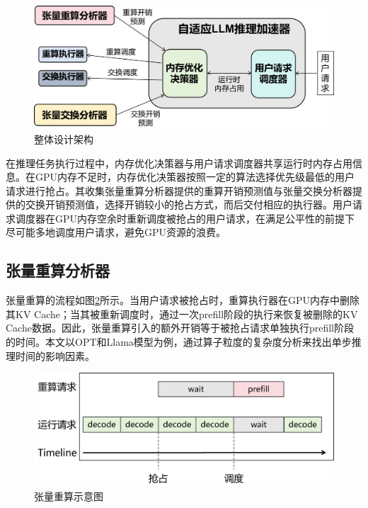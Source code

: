\documentclass[a4paper, nosysfonts]{hpcchina}
\begin{document}
\begin{figure}[!htbp]
  \centering
  \includegraphics[width=0.9\linewidth]
  {整体设计架构.png}
  \caption{整体设计架构}
  \label{整体设计架构}
\end{figure}
在推理任务执行过程中，内存优化决策器与用户请求调度器共享运行时内存占用信息。在GPU内存不足时，内存优化决策器按照一定的算法选择优先级最低的用户请求进行抢占。其收集张量重算分析器提供的重算开销预测值与张量交换分析器提供的交换开销预测值，选择开销较小的抢占方式，而后交付相应的执行器。用户请求调度器在GPU内存空余时重新调度被抢占的用户请求，在满足公平性的前提下尽可能多地调度用户请求，避免GPU资源的浪费。

\subsection{张量重算分析器}
张量重算的流程如图\ref{张量重算示意图}所示。当用户请求被抢占时，重算执行器在GPU内存中删除其KV Cache；当其被重新调度时，通过一次prefill阶段的执行来恢复被删除的KV Cache数据。因此，张量重算引入的额外开销等于被抢占请求单独执行prefill阶段的时间。本文以OPT和Llama模型为例，通过算子粒度的复杂度分析来找出单步推理时间的影响因素。
\begin{figure}[!htbp]
  \centering
  \includegraphics[width=0.9\linewidth]
  {张量重算示意图.png}
  \caption{张量重算示意图}
  \label{张量重算示意图}
\end{figure}
\end{document}
